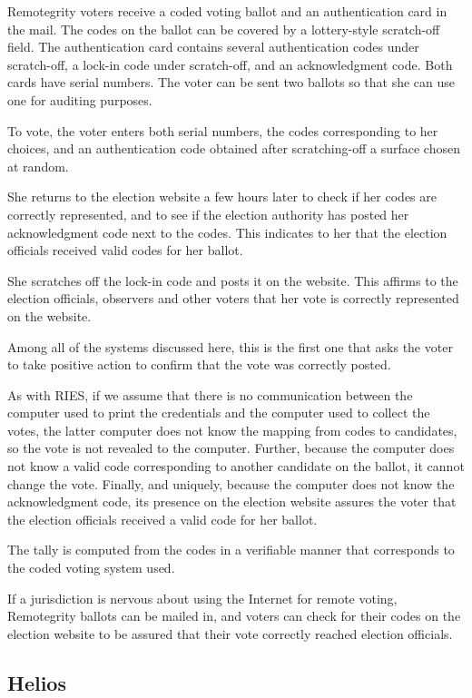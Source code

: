 Remotegrity voters receive a coded voting ballot and an authentication
card in the mail. The codes on the ballot can be covered by a
lottery-style scratch-off field. The authentication card contains
several authentication codes under scratch-off, a lock-in code under
scratch-off, and an acknowledgment code. Both cards have serial
numbers. The voter can be sent two ballots so that she can use one for
auditing purposes.

To vote, the voter enters both serial numbers, the codes corresponding
to her choices, and an authentication code obtained after
scratching-off a surface chosen at random.

She returns to the election website a few hours later to check if her
codes are correctly represented, and to see if the election authority
has posted her acknowledgment code next to the codes. This indicates
to her that the election officials received valid codes for her
ballot.

She scratches off the lock-in code and posts it on the website. This
affirms to the election officials, observers and other voters that her
vote is correctly represented on the website.

Among all of the systems discussed here, this is the first one that
asks the voter to take positive action to confirm that the vote was
correctly posted.

As with RIES, if we assume that there is no communication between the
computer used to print the credentials and the computer used to
collect the votes, the latter computer does not know the mapping
from codes to candidates, so the vote is not revealed to the
computer. Further, because the computer does not know a valid code
corresponding to another candidate on the ballot, it cannot change the
vote. Finally, and uniquely, because the computer does not know the
acknowledgment code, its presence on the election website assures the
voter that the election officials received a valid code for her
ballot.

The tally is computed from the codes in a verifiable manner that
corresponds to the coded voting system used.

If a jurisdiction is nervous about using the Internet for remote
voting, Remotegrity ballots can be mailed in, and voters can check for
their codes on the election website to be assured that their vote
correctly reached election officials.

\subsection{Helios}

